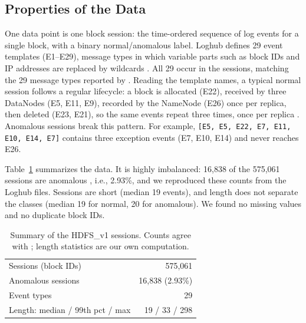 \documentclass[11pt]{article}
\begin{document}
\subsection{Properties of the Data}
One data point is one block session: the time-ordered sequence of log events for a
single block, with a binary normal/anomalous label. Loghub defines 29 event templates
(E1--E29), message types in which variable parts such as block IDs and IP addresses are
replaced by wildcards \citep{Loghub,Loghub2}. All 29 occur in the sessions, matching the 29
message types reported by \citet{Xu2009}. Reading the template names, a typical normal session follows a
regular lifecycle: a block is allocated (E22), received by three DataNodes (E5, E11,
E9), recorded by the NameNode (E26) once per replica, then deleted (E23, E21), so the
same events repeat three times, once per replica \citep{10.1109/MSST.2010.5496972}. Anomalous
sessions break this pattern. For example,
\texttt{[E5, E5, E22, E7, E11, E10, E14, E7]} contains three exception events (E7, E10,
E14) and never reaches E26.

Table~\ref{tab:dataset} summarizes the data. It is highly imbalanced: 16,838 of the
575,061 sessions are anomalous \citep{He2016}, i.e., 2.93\%, and we reproduced these
counts from the Loghub files. Sessions are short (median 19 events), and length does
not separate the classes (median 19 for normal, 20 for anomalous). We found no missing
values and no duplicate block IDs.

\begin{table}[t]
  \centering\small
  \begin{tabular}{@{}lr@{}}
    \hline
    Sessions (block IDs)           & 575,061 \\
    Anomalous sessions             & 16,838 (2.93\%) \\
    Event types                    & 29 \\
    Length: median / 99th pct / max & 19 / 33 / 298 \\
    \hline
  \end{tabular}
  \caption{\label{tab:dataset} Summary of the HDFS\_v1 sessions. Counts agree with
    \citet{He2016}; length statistics are our own computation.}
\end{table}
\end{document}
